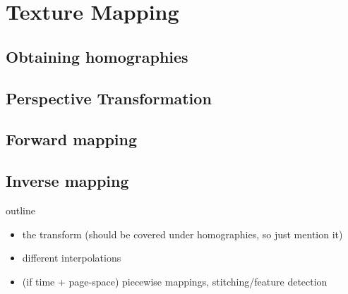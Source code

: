\section{Texture Mapping} 

\subsection{Obtaining homographies}

\subsection{Perspective Transformation}

\subsection{Forward mapping}

\subsection{Inverse mapping}

outline
\begin{itemize}
        \item the transform (should be covered under homographies, so just
	mention it)
	\item different interpolations
	\item (if time + page-space) piecewise mappings, stitching/feature detection
\end{itemize}

